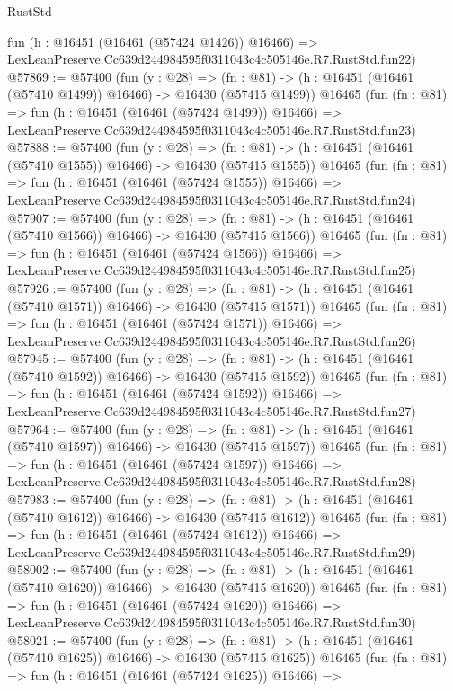 \begin{lexlean}{RustStd}
\begin{coremodule}
    fun (h : @16451 (@16461 (@57424 @1426)) @16466) =>
    LexLeanPreserve.Cc639d244984595f0311043c4c505146e.R7.RustStd.fun22)
@57869 := @57400
    (fun (y : @28) =>
    (fn : @81) -> (h : @16451 (@16461 (@57410 @1499)) @16466) -> @16430 (@57415 @1499))
    @16465
    (fun (fn : @81) =>
    fun (h : @16451 (@16461 (@57424 @1499)) @16466) =>
    LexLeanPreserve.Cc639d244984595f0311043c4c505146e.R7.RustStd.fun23)
@57888 := @57400
    (fun (y : @28) =>
    (fn : @81) -> (h : @16451 (@16461 (@57410 @1555)) @16466) -> @16430 (@57415 @1555))
    @16465
    (fun (fn : @81) =>
    fun (h : @16451 (@16461 (@57424 @1555)) @16466) =>
    LexLeanPreserve.Cc639d244984595f0311043c4c505146e.R7.RustStd.fun24)
@57907 := @57400
    (fun (y : @28) =>
    (fn : @81) -> (h : @16451 (@16461 (@57410 @1566)) @16466) -> @16430 (@57415 @1566))
    @16465
    (fun (fn : @81) =>
    fun (h : @16451 (@16461 (@57424 @1566)) @16466) =>
    LexLeanPreserve.Cc639d244984595f0311043c4c505146e.R7.RustStd.fun25)
@57926 := @57400
    (fun (y : @28) =>
    (fn : @81) -> (h : @16451 (@16461 (@57410 @1571)) @16466) -> @16430 (@57415 @1571))
    @16465
    (fun (fn : @81) =>
    fun (h : @16451 (@16461 (@57424 @1571)) @16466) =>
    LexLeanPreserve.Cc639d244984595f0311043c4c505146e.R7.RustStd.fun26)
@57945 := @57400
    (fun (y : @28) =>
    (fn : @81) -> (h : @16451 (@16461 (@57410 @1592)) @16466) -> @16430 (@57415 @1592))
    @16465
    (fun (fn : @81) =>
    fun (h : @16451 (@16461 (@57424 @1592)) @16466) =>
    LexLeanPreserve.Cc639d244984595f0311043c4c505146e.R7.RustStd.fun27)
@57964 := @57400
    (fun (y : @28) =>
    (fn : @81) -> (h : @16451 (@16461 (@57410 @1597)) @16466) -> @16430 (@57415 @1597))
    @16465
    (fun (fn : @81) =>
    fun (h : @16451 (@16461 (@57424 @1597)) @16466) =>
    LexLeanPreserve.Cc639d244984595f0311043c4c505146e.R7.RustStd.fun28)
@57983 := @57400
    (fun (y : @28) =>
    (fn : @81) -> (h : @16451 (@16461 (@57410 @1612)) @16466) -> @16430 (@57415 @1612))
    @16465
    (fun (fn : @81) =>
    fun (h : @16451 (@16461 (@57424 @1612)) @16466) =>
    LexLeanPreserve.Cc639d244984595f0311043c4c505146e.R7.RustStd.fun29)
@58002 := @57400
    (fun (y : @28) =>
    (fn : @81) -> (h : @16451 (@16461 (@57410 @1620)) @16466) -> @16430 (@57415 @1620))
    @16465
    (fun (fn : @81) =>
    fun (h : @16451 (@16461 (@57424 @1620)) @16466) =>
    LexLeanPreserve.Cc639d244984595f0311043c4c505146e.R7.RustStd.fun30)
@58021 := @57400
    (fun (y : @28) =>
    (fn : @81) -> (h : @16451 (@16461 (@57410 @1625)) @16466) -> @16430 (@57415 @1625))
    @16465
    (fun (fn : @81) =>
    fun (h : @16451 (@16461 (@57424 @1625)) @16466) =>

\end{coremodule}
\end{lexlean}
